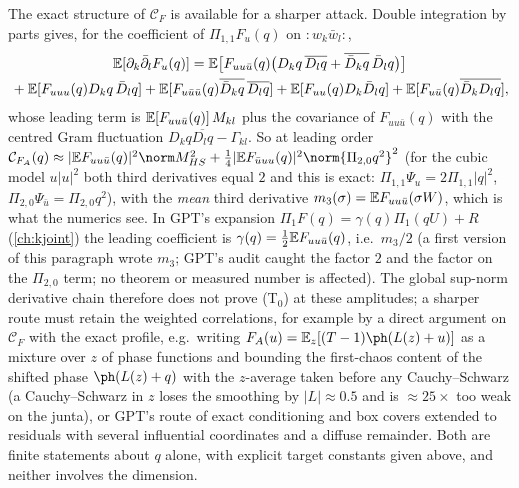 The exact structure of $\mathcal C_F$ is available for a sharper attack. Double integration by parts gives, for the coefficient of $\Pi_{1,1}F_u(q)$ on ${:}w_k\bar w_l{:}$,
\[\begin{gathered}
\mathbb E[\partial_k\bar\partial_lF_u(q)]=\mathbb E\bigl[F_{uu\bar u}(q)\bigl(D_kq\,\overline{D_lq}+\overline{\bar D_kq}\,\bar D_lq\bigr)\bigr]\\
{}+\mathbb E[F_{uuu}(q)D_kq\,\bar D_lq]+\mathbb E[F_{u\bar u\bar u}(q)\overline{\bar D_kq}\,\overline{D_lq}]
+\mathbb E[F_{uu}(q)D_k\bar D_lq]+\mathbb E[F_{u\bar u}(q)\overline{\bar D_kD_lq}],
\end{gathered}\]
whose leading term is $\mathbb E[F_{uu\bar u}(q)]\,M_{kl}$ plus the covariance of $F_{uu\bar u}(q)$ with the centred Gram fluctuation $D_kq\overline{D_lq}-\Gamma_{kl}$. So at leading order
$\mathcal C_{F_A}(q)\approx|\E F_{uu\bar u}(q)|^2\norm M_{HS}^2+\tfrac14|\E F_{\bar uuu}(q)|^2\norm{\Pi_{2,0}q^2}^2$ (for the cubic model $u|u|^2$ both third derivatives equal $2$ and this is exact:
$\Pi_{1,1}\Psi_u=2\Pi_{1,1}|q|^2$, $\Pi_{2,0}\Psi_{\bar u}=\Pi_{2,0}q^2$), with the \emph{mean} third derivative $m_3(\sigma)=\mathbb E F_{uu\bar u}(\sigma W)$, which is what the numerics see. In GPT's
expansion $\Pi_1F(q)=\gamma(q)\Pi_1(qU)+R$ (\autoref{ch:kjoint}) the leading coefficient is $\gamma(q)=\tfrac12\mathbb E F_{uu\bar u}(q)$, i.e.\ $m_3/2$ (a first version of this paragraph
wrote $m_3$; GPT's audit caught the factor $2$ and the factor on the $\Pi_{2,0}$ term; no theorem or measured number is affected). The global sup-norm derivative chain therefore does not prove (T$_0$) at these amplitudes; a sharper route must retain the weighted correlations, for example by a direct argument on $\mathcal C_F$ with the exact profile, e.g.\ writing
$F_A(u)=\E_z[(T-1)\ph(L(z)+u)]$ as a mixture over $z$ of phase functions and bounding the first-chaos content of the shifted phase $\ph(L(z)+q)$ with the $z$-average taken before any
Cauchy--Schwarz (a Cauchy--Schwarz in $z$ loses the smoothing by $|L|\approx0.5$ and is $\approx25\times$ too weak on the junta), or GPT's route of exact conditioning and box covers
extended to residuals with several influential coordinates and a diffuse remainder. Both are finite statements about $q$ alone, with explicit target constants given above, and neither involves the
dimension.

